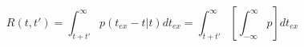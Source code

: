 \begin{equation}
R(t,t') = \int_{t+t'}^\infty p(t_{ex}-t|t) dt_{ex}  = \int_{t+t'}^\infty \left[ \int_{-\infty}^\infty p\right]  dt_{ex}
\end{equation}